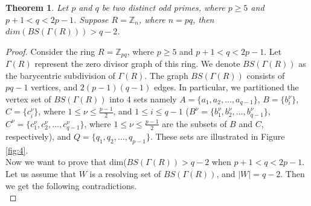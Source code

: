 \documentclass[]{interact}
\theoremstyle{plain}%
\newtheorem{theorem}{Theorem}[section]
\theoremstyle{definition}
\theoremstyle{remark}
\begin{document}
\begin{theorem}
Let $p$ and $q$ be two distinct odd primes, where $p\geq 5$ and $p+1<q<2p-1$. Suppose $R=\mathbb{Z}_n$, where $n=pq$, then
$dim(BS(\Gamma(R))) > q-2$. 
 \end{theorem}
    \begin{proof}
\noindent Consider the ring $R = \mathbb{Z}_{pq}$, where $p \geq 5$ and $p + 1 < q < 2p - 1$. Let $\Gamma(R)$ represent the zero divisor graph of this ring. We denote $BS(\Gamma(R))$ as the barycentric subdivision of $\Gamma(R)$. The graph $BS(\Gamma(R))$ consists of $pq-1$ vertices, and $2(p-1)(q-1)$ edges. In particular, we partitioned the vertex set of $BS(\Gamma(R))$ into 4 sets namely $A=\{a_1,a_2,\ldots, a_{q-1}\}$,  $B=\{b^\nu_i\}$, $C=\{c^\nu_i\}$, where $1\leq \nu\leq \frac{p-1}{2}$, and $1\leq i\leq {q-1}$ ($B^\nu=\{b^\nu_1,b^\nu_2,\ldots,b^\nu_{q-1}\}$, $C^\nu=\{c^\nu_1,c^\nu_2,\ldots,c^\nu_{q-1}\}$, where $1\leq \nu \leq \frac{p-1}{2}$ are the subsets of $B$ and $C$, respectively), and $Q=\{q_1,q_2, \ldots, q_{p-1}\}$. These sets are illustrated in Figure \ref{fig:4}. \\

\noindent Now we want to prove that dim($BS(\Gamma(R)) > q-2$ when $p+1< q<2p-1$. Let us assume that $W$ is a resolving set of $BS(\Gamma(R))$, and $|W|=q-2$. Then we get the following contradictions. \\



\end{proof}
\end{document}

